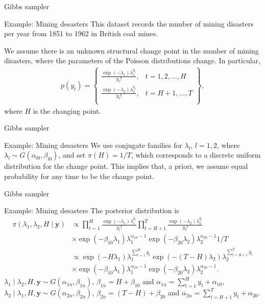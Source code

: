 \documentclass[12pt, compress]{beamer}
\begin{document}
\begin{frame}{Gibbs sampler}
\begin{block}{Example: Mining desasters}
	This dataset records the number of mining disasters per year from 1851 to 1962 in British coal mines.
	
	We assume there is an unknown structural change point in the number of mining disasters, where the parameters of the Poisson distributions change. In particular,
	\begin{align*}
		p(y_t)=\begin{Bmatrix}
			\frac{\exp(-\lambda_1)\lambda_1^{y_t}}{y_t!}, & t=1,2,\dots,H\\
			\frac{\exp(-\lambda_2)\lambda_2^{y_t}}{y_t!}, & t=H+1,\dots,T\\
		\end{Bmatrix},
	\end{align*}  
	where $H$ is the changing point.

\end{block}
\end{frame}

\begin{frame}{Gibbs sampler}
	\begin{block}{Example: Mining desasters}
		We use conjugate families for $\lambda_l$, $l = 1, 2$, where $\lambda_l \sim G(\alpha_{l0}, \beta_{l0})$, and set $\pi(H) = 1 / T$, which corresponds to a discrete uniform distribution for the change point. This implies that, a priori, we assume equal probability for any time to be the change point.
		
	\end{block}
\end{frame}

\begin{frame}{Gibbs sampler}
	\begin{block}{Example: Mining desasters}
The posterior distribution is
{\small{
\begin{align*}
	\pi(\lambda_1,\lambda_2,H\mid \bm{y})&\propto \prod_{t=1}^{H} \frac{\exp(-\lambda_1)\lambda_1^{y_t}}{y_t!} \prod_{t=H+1}^{T}\frac{\exp(-\lambda_2)\lambda_2^{y_t}}{y_t!}\\
	&\times \exp(-\beta_{10}\lambda_1)\lambda_1^{\alpha_{10}-1} \exp(-\beta_{20}\lambda_2)\lambda_2^{\alpha_{20}-1} 1/T\\
	&\propto\exp(-H\lambda_1)\lambda_1^{\sum_{t=1}^H y_t}\exp(-(T-H)\lambda_2)\lambda_2^{\sum_{t=H+1}^T y_t}\\
	&\times \exp(-\beta_{10}\lambda_1)\lambda_1^{\alpha_{10}-1} \exp(-\beta_{20}\lambda_2)\lambda_2^{\alpha_{20}-1}.
\end{align*} 
}}
$\lambda_1\mid \lambda_2,H,\bm{y}\sim G(\alpha_{1n},\beta_{1n})$, $\beta_{1n}=H+\beta_{10}$ and $\alpha_{1n}=\sum_{t=1}^H y_t+\alpha_{10}$, $\lambda_2\mid \lambda_1,H,\bm{y}\sim G(\alpha_{2n},\beta_{2n})$, $\beta_{2n}=(T-H)+\beta_{20}$ and $\alpha_{2n}=\sum_{t=H+1}^T y_t+\alpha_{20}$.		
	\end{block}
\end{frame}
\end{document}
